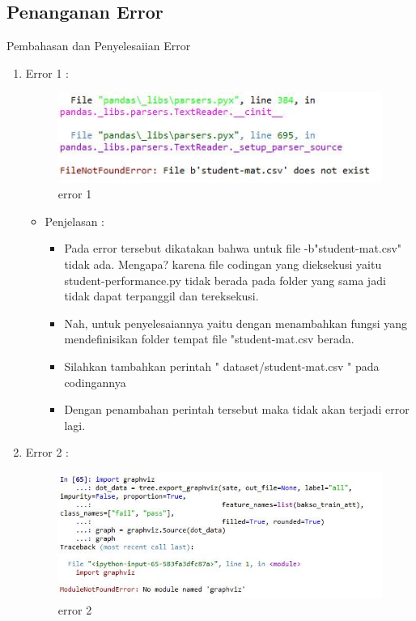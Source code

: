 \subsection{Penanganan Error}
\par Pembahasan dan Penyelesaiian Error
\par
\begin{enumerate}
\item Error 1	: 
\par
\par

\begin{figure}[ht]
\centering
\includegraphics[scale=0.4]{figures/errorr.jpg}
\caption{error 1}
\label{contoh}
\end{figure}

\par
\begin{itemize}
\item Penjelasan	: 
\begin{itemize}
\item Pada error tersebut dikatakan bahwa untuk file -b"student-mat.csv" tidak ada. Mengapa? karena file codingan yang dieksekusi yaitu student-performance.py tidak berada pada folder yang sama jadi tidak dapat terpanggil dan tereksekusi.
\item Nah, untuk penyelesaiannya yaitu dengan menambahkan fungsi yang mendefinisikan folder tempat file "student-mat.csv berada. 
\item Silahkan tambahkan perintah " dataset/student-mat.csv " pada codingannya
\item Dengan penambahan perintah tersebut maka tidak akan terjadi error lagi.
\end{itemize}
\end{itemize}



\par
\item Error 2	:
\par

\begin{figure}[ht]
\centering
\includegraphics[scale=0.4]{figures/error6.jpg}
\caption{error 2}
\label{contoh}
\end{figure}



\end{enumerate}
